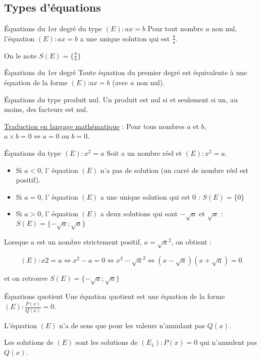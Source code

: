 \begin{pageCours} %


\section{Types d'équations}

\begin{PpT}{{Équations du 1er degré du type $(E):ax=b$}}
Pour tout nombre $a$ non nul, l'équation $(E):ax=b$ a une unique solution qui est $\frac{b}{a}$.

On le note $S(E)=\{\frac{b}{a}\}$
\end{PpT}

\begin{PpT}{Équations du 1er degré}
Toute équation du premier degré est équivalente à une équation de la forme $(E)$:$ax=b$  (avec $a$ non nul).
\end{PpT}

\begin{PpT}{Équations du type produit nul.}
Un produit est nul si et seulement si un, au moins, des facteurs est nul.

\underline{Traduction en langage mathématique} :  Pour tous nombres $a$ et $b$,  $a\times b=0\Leftrightarrow a=0$ ou $b=0$.
\end{PpT}

\begin{PpT}{{Équations du type $(E):x^2=a$ }}
Soit a un nombre réel et $(E):x^2=a$.
\begin{itemize}
\item Si $a<0$, l' équation $(E)$ n'a pas de solution (un carré de nombre réel est positif).
\item Si $a=0$, l' équation $(E)$ a une unique solution qui est $0$ : $S(E)=\{0\}$
\item Si $a>0$, l' équation $(E)$ a deux solutions qui sont $-\sqrt{a}$ et $\sqrt{a}$ : $S(E)=\{-\sqrt{a};\sqrt{a}\}$
\end{itemize}
\end{PpT}

\begin{Rq}
Lorsque $a$ est un nombre strictement positif, $a=\sqrt{a}^2$, on obtient :

\[(E):x2=a
  \Leftrightarrow x^2-a=0 \Leftrightarrow x^2-\sqrt{a}^2 \Leftrightarrow (x-\sqrt{a})(x+\sqrt{a})=0\]

et on retrouve $S(E)=\{-\sqrt{a};\sqrt{a}\}$
\end{Rq}

\begin{PpT}{Équations quotient}
Une équation quotient est une équation de la forme $(E):\frac{P(x)}{Q(x)}=0$.

L'équation $(E)$ n'a de sens que pour les valeurs n'annulant pas $Q(x)$.

Les solutions de $(E)$ sont les solutions de $(E_1):P(x)=0$ qui n'annulent pas $Q(x)$.
\end{PpT}

\end{pageCours} %


